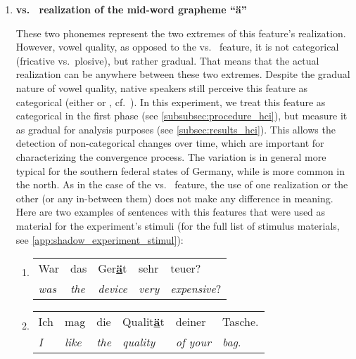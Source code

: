 \begin{enumerate}
	\item \textbf{\textipa{[e:]} vs.\ \textipa{[E:]} realization of the mid-word grapheme \enquote{ä}}
	
	These two phonemes represent the two extremes of this feature's realization.
	However, vowel quality, as opposed to the \textipa{[\c{c}]} vs.\ \textipa{[k]} feature, it is not categorical (fricative vs.\ plosive), but rather gradual.
	That means that the actual realization can be anywhere between these two extremes.
	Despite the gradual nature of vowel quality, native speakers still perceive this feature as categorical (either \textipa{[e]} or \textipa{[E]}, cf.\ \citet{Kuhl2004early, Kuhl1991human}).
	In this experiment, we treat this feature as categorical in the first phase (see \cref{subsubsec:procedure_hci}), but measure it as gradual for analysis purposes (see \cref{subsec:results_hci}).
	This allows the detection of non-categorical changes over time, which are important for characterizing the convergence process.
	The \textipa{[E]} variation is in general more typical for the southern federal states of Germany, while \textipa{[e]} is more common in the north.
	As in the case of the \textipa{[\c{c}]} vs.\ \textipa{[k]} feature, the use of one realization or the other (or any in-between them) does not make any difference in meaning.
	Here are two examples of sentences with this features that were used as material for the experiment's stimuli (for the full list of stimulus materials, see \autoref{app:shadow_experiment_stimul}):
	
	\begin{enumerate}[label=\arabic{enumi}\alph*), ref=\arabic{enumi}\alph*.)]
		\item 
		\begin{tabulary}{\linewidth}{LLLLL}
			War & das & Ger\textbf{\underline{ä}}t & sehr & teuer?\\
			\textit{was} & \textit{the} & \textit{device} & \textit{very} & \textit{expensive}?\\
		\end{tabulary}
		\item
		\begin{tabulary}{\linewidth}{LLLLLL}
			Ich & mag & die & Qualit\textbf{\underline{ä}}t & deiner & Tasche.\\
			\textit{I} & \textit{like} & \textit{the} & \textit{quality} & \textit{of your} & \textit{bag}.\\
		\end{tabulary}
	\end{enumerate}
	

\end{enumerate}
